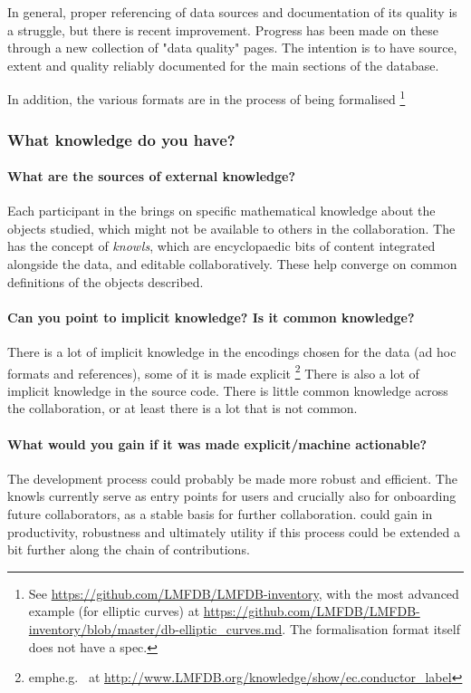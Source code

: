 In general, proper referencing of data sources and documentation of its quality is a struggle, but there is recent improvement.
Progress has been made on these through a new collection of "data quality" pages. The intention is to have source, extent and quality reliably documented for the main sections of the database.

In addition, the various formats are in the process of being formalised \footnote{See \url{https://github.com/LMFDB/LMFDB-inventory}, with the most advanced example (for elliptic curves) at \url{https://github.com/LMFDB/LMFDB-inventory/blob/master/db-elliptic_curves.md}. The formalisation format itself does not have a spec.}


\subsubsection{What knowledge do you have?}
\paragraph{What are the sources of external knowledge?}
Each participant in the \LMFDB brings on specific mathematical knowledge about the objects studied, which might not be available to others in the collaboration. The \LMFDB has the concept of \emph{knowls}, which are encyclopaedic bits of content integrated alongside the data, and editable collaboratively. These help converge on common definitions of the objects described.


\paragraph{Can you point to implicit knowledge? Is it common knowledge?}
There is a lot of implicit knowledge in the encodings chosen for the data (ad hoc formats and references), some of it is made explicit \footnote{emph{e.g.}~ at \url{http://www.LMFDB.org/knowledge/show/ec.conductor_label}}
There is also a lot of implicit knowledge in the source code. There is little common knowledge across the collaboration, or at least there is a lot that is not common.

\paragraph{What would you gain if it was made explicit/machine actionable?}
The development process could probably be made more robust and efficient. The knowls currently serve as entry points for users and crucially also for onboarding future collaborators, as a stable basis for further collaboration. \LMFDB could gain in productivity, robustness and ultimately utility if this process could be extended a bit further along the chain of contributions.

